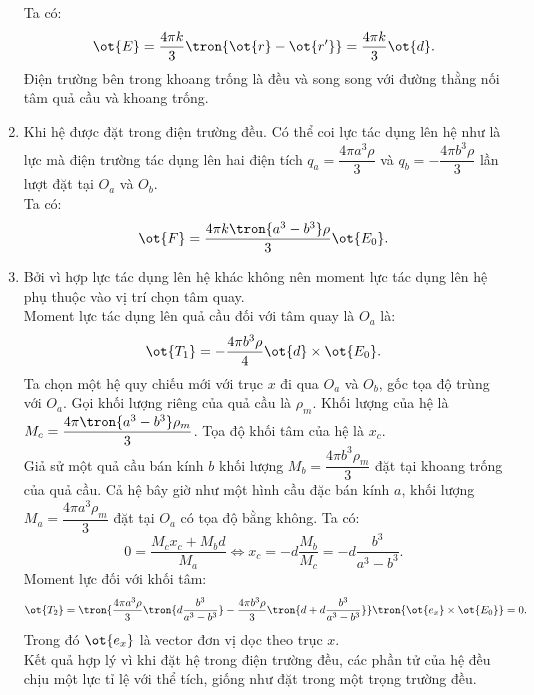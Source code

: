 \begin{loigiai}
\begin{enumerate}[1)]
\begin{center}

        \end{center}
        Ta có:
        \begin{equation*}
            \ot{E}=\dfrac{4\pi k}{3}\tron{\ot{r}-\ot{r'}}=\dfrac{4\pi k}{3}\ot{d}.
        \end{equation*}
        Điện trường bên trong khoang trống là đều và song song với đường thằng nối tâm quả cầu và khoang trống.
        \item Khi hệ được đặt trong điện trường đều. Có thể coi lực tác dụng lên hệ như là lực mà điện trường tác dụng lên hai điện tích $q_a=\dfrac{4\pi a^3\rho}{3}$ và $q_b=-\dfrac{4\pi b^3\rho}{3}$ lần lượt đặt tại $O_a$ và $O_b$. \\ 
        Ta có:
        \begin{equation*}
            \ot{F}=\dfrac{4\pi k\tron{a^3-b^3}\rho}{3}\ot{E_0}.
        \end{equation*}
        \item Bởi vì hợp lực tác dụng lên hệ khác không nên moment lực tác dụng lên hệ phụ thuộc vào vị trí chọn tâm quay.\\
        Moment lực tác dụng lên quả cầu đối với tâm quay là $O_a$ là:
        $$\ot{T_1}=-\dfrac{4\pi b^3\rho}{4}\ot{d}\times\ot{E_0}.$$
        Ta chọn một hệ quy chiếu mới với trục $x$ đi qua $O_a$ và $O_b$, gốc tọa độ trùng với $O_a$. Gọi khối lượng riêng của quả cầu là $\rho_m$. Khối lượng của hệ là $M_c=\dfrac{4\pi \tron{a^3-b^3}\rho_m}{3}$. Tọa độ khối tâm của hệ là $x_c$. 
        \\
        Giả sử một quả cầu bán kính $b$ khối lượng $M_b=\dfrac{4\pi b^3\rho_m}{3}$ đặt tại khoang trống của quả cầu. Cả hệ bây giờ như một hình cầu đặc bán kính $a$, khối lượng $M_a=\dfrac{4\pi a^3\rho_m}{3}$ đặt tại $O_a$ có tọa độ bằng không. Ta có:
        $$0=\dfrac{M_cx_c+M_bd}{M_a}\Leftrightarrow x_c=-d\dfrac{M_b}{M_c}=-d\dfrac{b^3}{a^3-b^3}.$$
        Moment lực đối với khối tâm:
        $$\ot{T_2}=\tron{\dfrac{4\pi a^3\rho}{3}\tron{d\dfrac{b^3}{a^3-b^3}}-\dfrac{4\pi b^3\rho }{3}\tron{d+d\dfrac{b^3}{a^3-b^3}}}\tron{\ot{e_x}\times\ot{E_0}}=0.$$
        Trong đó $\ot{e_x}$ là vector đơn vị dọc theo trục $x$.\\
        Kết quả hợp lý vì khi đặt hệ trong điện trường đều, các phần tử của hệ đều chịu một lực tỉ lệ với thể tích, giống như đặt trong một trọng trường đều.
    \end{enumerate}
    \end{loigiai}
    
